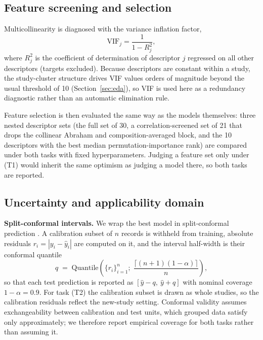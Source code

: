 \subsection{Feature screening and selection}
\label{sec:screening}

Multicollinearity is diagnosed with the variance inflation factor,
\begin{equation}
\mathrm{VIF}_j = \frac{1}{1 - R_j^{2}},
\label{eq:vif}
\end{equation}
where $R_j^{2}$ is the coefficient of determination of descriptor $j$
regressed on all other descriptors (targets excluded). Because
descriptors are constant within a study, the study-cluster structure
drives VIF values orders of magnitude beyond the usual threshold of 10
(Section~\ref{sec:eda}), so VIF is used here as a redundancy diagnostic
rather than an automatic elimination rule.

Feature selection is then evaluated the same way as the models
themselves: three nested descriptor sets (the full set of 30, a
correlation-screened set of 21 that drops the collinear Abraham and
composition-averaged block, and the 10 descriptors with the best median
permutation-importance rank) are compared under both tasks with fixed
hyperparameters. Judging a feature set only under (T1) would inherit
the same optimism as judging a model there, so both tasks are reported.

\subsection{Uncertainty and applicability domain}
\label{sec:uq}

\textbf{Split-conformal intervals.} We wrap the best model in
split-conformal prediction \citep{vovk2005conformal, lei2018conformal}.
A calibration subset of $n$ records is withheld from training, absolute
residuals $r_i = |y_i - \hat{y}_i|$ are computed on it, and the interval
half-width is their conformal quantile
\begin{equation}
q \;=\; \mathrm{Quantile}\!\left(\{r_i\}_{i=1}^{n};\;
\frac{\lceil (n+1)(1-\alpha) \rceil}{n}\right),
\label{eq:conformal}
\end{equation}
so that each test prediction is reported as $[\hat{y}-q,\ \hat{y}+q]$
with nominal coverage $1-\alpha = 0.9$. For task (T2) the calibration
subset is drawn as whole studies, so the calibration residuals reflect
the new-study setting. Conformal validity assumes exchangeability
between calibration and test units, which grouped data satisfy only
approximately; we therefore report empirical coverage for both tasks
rather than assuming it.

